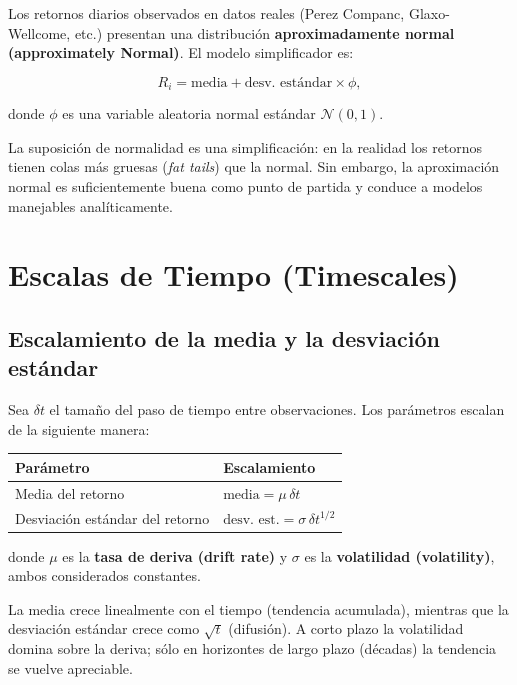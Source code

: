 \documentclass[12pt]{article}
\begin{document}
Los retornos diarios observados en datos reales (Perez Companc, Glaxo-Wellcome, etc.)
presentan una distribuci\'on \textbf{aproximadamente normal (approximately Normal)}.
El modelo simplificador es:

\begin{equation}
  R_i = \text{media} + \text{desv.~est\'andar} \times \phi,
  \label{eq:normret}
\end{equation}

donde $\phi$ es una variable aleatoria normal est\'andar $\mathcal{N}(0,1)$.

\begin{intuicion}
La suposici\'on de normalidad es una simplificaci\'on: en la realidad los retornos
tienen colas m\'as gruesas (\textit{fat tails}) que la normal. Sin embargo, la
aproximaci\'on normal es suficientemente buena como punto de partida y conduce a
modelos manejables anal\'iticamente.
\end{intuicion}

\section{Escalas de Tiempo (Timescales)}

\subsection{Escalamiento de la media y la desviaci\'on est\'andar}

Sea $\delta t$ el tama\~no del paso de tiempo entre observaciones.
Los par\'ametros escalan de la siguiente manera:

\begin{center}
\begin{tabular}{ll}
  \toprule
  Par\'ametro & Escalamiento \\
  \midrule
  Media del retorno & $\text{media} = \mu\,\delta t$ \\
  Desviaci\'on est\'andar del retorno & $\text{desv.~est.} = \sigma\,\delta t^{1/2}$ \\
  \bottomrule
\end{tabular}
\end{center}

donde $\mu$ es la \textbf{tasa de deriva (drift rate)} y $\sigma$ es la
\textbf{volatilidad (volatility)}, ambos considerados constantes.

\begin{intuicion}
La media crece linealmente con el tiempo (tendencia acumulada), mientras que la
desviaci\'on est\'andar crece como $\sqrt{t}$ (difusi\'on). A corto plazo la
volatilidad domina sobre la deriva; s\'olo en horizontes de largo plazo (d\'ecadas)
la tendencia se vuelve apreciable.
\end{intuicion}
\end{document}
